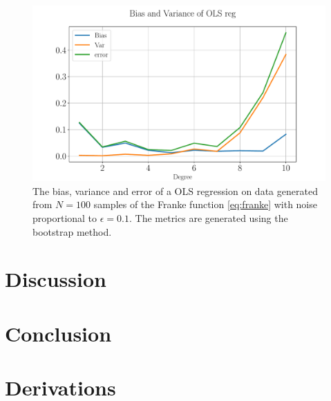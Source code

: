 \documentclass[%
reprint,
amsmath,amssymb,
aps,
pra,
]{revtex4-2}
\begin{document}
\begin{figure}[H]
	\centering
	\includegraphics[width=\linewidth]{Python/Figures/OLS/OLS_Bootstrap_BiasVar_no_scaling_GOOD.pdf}
	\caption{The bias, variance and error of a OLS regression on data generated from \(N=100\) samples of the Franke function \eqref{eq:franke} with noise proportional to \(\epsilon=0.1\). The metrics are generated using the bootstrap method.}
	\label{fig:CV_0}
\end{figure}


\section{Discussion} 


\section{Conclusion}




\appendix
\section{Derivations}
\label{Appendix:Derivations}
\end{document}
